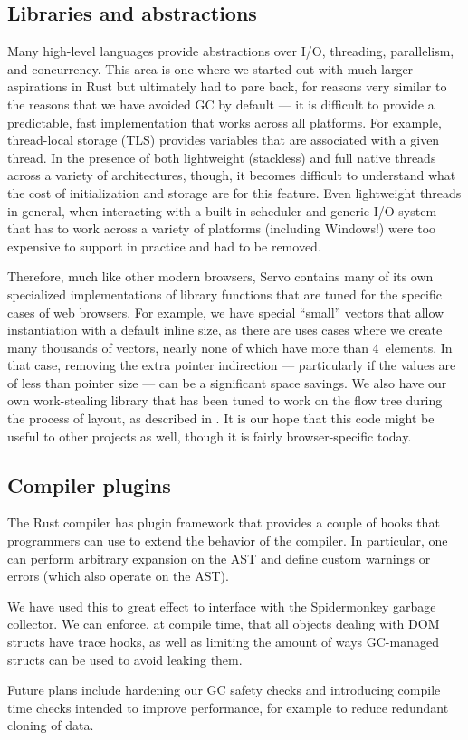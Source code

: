 \subsection{Libraries and abstractions}
Many high-level languages provide abstractions over I/O, threading, parallelism, and concurrency.
This area is one where we started out with much larger aspirations in Rust but ultimately had to pare back,
for reasons very similar to the reasons that we have avoided GC by default --- it is difficult to provide a
predictable, fast implementation that works across all platforms.
For example, thread-local storage (TLS) provides variables that are associated with a given thread.
In the presence of both lightweight (stackless) and full native threads across a variety of architectures, though,
it becomes difficult to understand what the cost of initialization and storage are for this feature.
Even lightweight threads in general, when interacting with a built-in scheduler and generic I/O system that
has to work across a variety of platforms (including Windows!) were too expensive to support in practice and
had to be removed.

Therefore, much like other modern browsers, Servo contains many of its own specialized implementations of
library functions that are tuned for the specific cases of web browsers.
For example, we have special ``small'' vectors that allow instantiation with a default inline size,
as there are uses cases where we create many thousands of vectors, nearly none of which have more than 4~elements.
In that case, removing the extra pointer indirection --- particularly if the values are of less than pointer size ---
can be a significant space savings.
We also have our own work-stealing library that has been tuned to work on the flow tree during the process of layout,
as described in .
It is our hope that this code might be useful to other projects as well, though it is fairly browser-specific today.

\subsection{Compiler plugins}

The Rust compiler has plugin framework that provides a couple of hooks that programmers can use to extend the behavior of the compiler. In particular, one can perform arbitrary expansion on the AST and define custom warnings or errors (which also operate on the AST).

We have used this to great effect to interface with the Spidermonkey garbage collector. We can enforce, at compile time, that all objects dealing with DOM structs have trace hooks, as well as limiting the amount of ways GC-managed structs can be used to avoid leaking them.

Future plans include hardening our GC safety checks and introducing compile time checks intended to improve performance, for example to reduce redundant cloning of data.